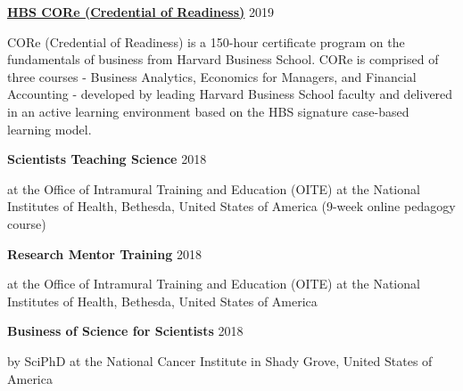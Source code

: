 \documentclass[margin,line]{res}
\begin{document}
\begin{resume}
\vspace*{-2mm}

{\bf \href{https://online.hbs.edu/courses/core/}{HBS CORe (Credential of Readiness)}} \hfill {2019}\\
\vspace*{-3.5mm}
\begin{addmargin}[0pt]{.1\linewidth}
\vspace*{-1mm}
CORe (Credential of Readiness) is a 150-hour certificate program on the fundamentals of business from Harvard Business School. CORe is comprised of three courses - Business Analytics, Economics for Managers, and Financial Accounting - developed by leading Harvard Business School faculty and delivered in an active learning environment based on the HBS signature case-based learning model.
\end{addmargin}

\vspace*{-2mm}

{\bf Scientists Teaching Science} \hfill {2018}\\
\vspace*{-3.5mm}
\begin{addmargin}[0pt]{.1\linewidth}
\vspace*{-1mm}
at the Office of Intramural Training and Education (OITE) at the National Institutes of Health, Bethesda, United States of America (9-week online pedagogy course)
\end{addmargin}

\vspace*{-2mm}

{\bf Research Mentor Training} \hfill {2018}\\
\vspace*{-3.5mm}
\begin{addmargin}[0pt]{.1\linewidth}
\vspace*{-1mm}
at the Office of Intramural Training and Education (OITE) at the National Institutes of Health, Bethesda, United States of America 
\end{addmargin}

\vspace*{-2mm}

{\bf Business of Science for Scientists} \hfill {2018}\\
\vspace*{-3.5mm}
\begin{addmargin}[0pt]{.1\linewidth}
\vspace*{-1mm}
by SciPhD at the National Cancer Institute in Shady Grove, United States of America
\end{addmargin}


\end{resume}
\end{document}
